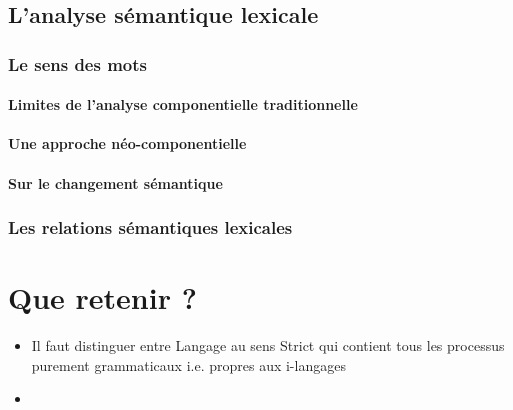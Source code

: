     \subsection{L'analyse s\'emantique lexicale}
      \subsubsection{Le sens des mots}
        \paragraph{Limites de l'analyse componentielle traditionnelle}
      
        \paragraph{Une approche n\'eo-componentielle}
      
        \paragraph{Sur le changement s\'emantique}
      \subsubsection{Les relations s\'emantiques lexicales}    
    
    \section{Que retenir ?}
      \begin{itemize}
      	\item Il faut distinguer entre Langage au sens Strict qui contient tous les processus purement grammaticaux i.e. propres aux i-langages
      	\item 
      \end{itemize}